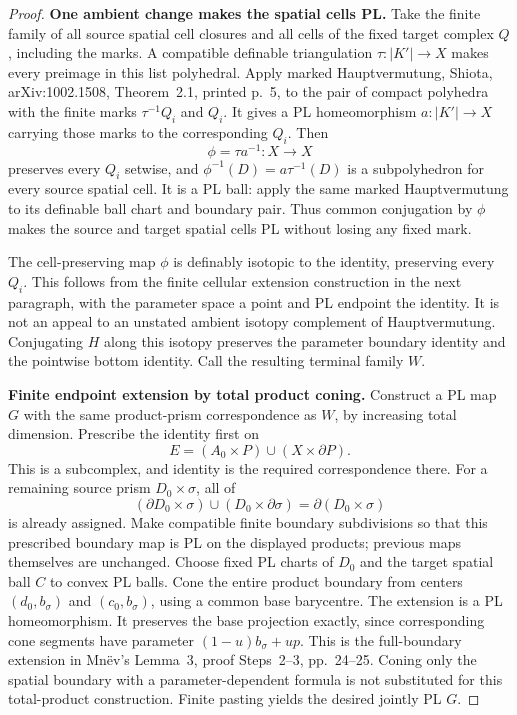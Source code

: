 \documentclass[11pt,a4paper]{article}
\theoremstyle{definition}
\begin{document}
\begin{proof}
\textbf{One ambient change makes the spatial cells PL.}\quad
Take the finite family of all source spatial cell closures and all
cells of the fixed target complex \(Q\), including the marks.
A compatible definable triangulation
\(\tau:|K'|\to X\) makes every preimage in this list polyhedral.
Apply marked Hauptvermutung, Shiota, arXiv:1002.1508,
Theorem~2.1, printed p.~5, to the pair of compact polyhedra with
the finite marks \(\tau^{-1}Q_i\) and \(Q_i\).
It gives a PL homeomorphism \(a:|K'|\to X\) carrying those marks
to the corresponding \(Q_i\). Then
\begin{equation}
 \phi=\tau a^{-1}:X\to X
 \label{equation-91}
\end{equation}
preserves every \(Q_i\) setwise, and
\(\phi^{-1}(D)=a\tau^{-1}(D)\) is a subpolyhedron for every source
spatial cell. It is a PL ball: apply the same marked
Hauptvermutung to its definable ball chart and boundary pair.
Thus common conjugation by \(\phi\) makes the source and target
spatial cells PL without losing any fixed mark.

The cell-preserving map \(\phi\) is definably isotopic to the identity,
preserving every \(Q_i\). This follows from the finite cellular
extension construction in the next paragraph, with the parameter
space a point and PL endpoint the identity. It is not an appeal to
an unstated ambient isotopy complement of Hauptvermutung.
Conjugating \(H\) along this isotopy preserves the parameter boundary
identity and the pointwise bottom identity. Call the resulting
terminal family \(W\).

\textbf{Finite endpoint extension by total product coning.}\quad
Construct a PL map \(G\) with the same product-prism correspondence
as \(W\), by increasing total dimension. Prescribe the identity
first on
\[
 E=(A_0\times P)\cup(X\times\partial P).
\]
This is a subcomplex, and identity is the required correspondence
there. For a remaining source prism \(D_0\times\sigma\), all of
\[
 (\partial D_0\times\sigma)\cup(D_0\times\partial\sigma)
       =\partial(D_0\times\sigma)
\]
is already assigned. Make compatible finite boundary subdivisions
so that this prescribed boundary map is PL on the displayed products;
previous maps themselves are unchanged. Choose fixed PL charts of
\(D_0\) and the target spatial ball \(C\) to convex PL balls.
Cone the entire product boundary from centers
\((d_0,b_\sigma)\) and \((c_0,b_\sigma)\), using a common base
barycentre. The extension is a PL homeomorphism. It preserves the
base projection exactly, since corresponding cone segments have
parameter \((1-u)b_\sigma+up\).
This is the full-boundary extension in Mn\"ev's Lemma~3,
proof Steps~2--3, pp.~24--25. Coning only the spatial boundary
with a parameter-dependent formula is not substituted for this
total-product construction.
Finite pasting yields the desired jointly PL \(G\).


\end{proof}
\end{document}
